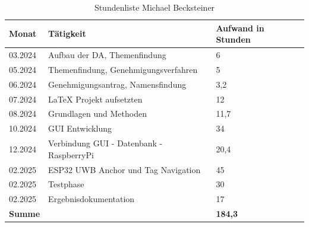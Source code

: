 \begin{table}[h]
	\begin{tabular}{p{2.5cm} p{10.5cm} p{2.5cm}}
		\hline
		\textbf{Monat} & \textbf{Tätigkeit} & \textbf{Aufwand in Stunden} \\
		\hline
		03.2024 & Aufbau der DA, Themenfindung & 6 \\
		05.2024 & Themenfindung, Genehmigungsverfahren & 5 \\
		06.2024 & Genehmigungsantrag, Namensfindung & 3,2 \\
		07.2024 & LaTeX Projekt aufsetzten& 12 \\
		08.2024 & Grundlagen und Methoden & 11,7 \\
		10.2024 & GUI Entwicklung & 34 \\
		12.2024 & Verbindung GUI - Datenbank - RaspberryPi & 20,4 \\
		02.2025 & ESP32 UWB Anchor und Tag Navigation & 45 \\
		02.2025 & Testphase & 30 \\
		02.2025 &Ergebnisdokumentation & 17 \\
		
		\hline
		\textbf{Summe} & & \textbf{184,3} \\
		\hline
	\end{tabular}
	\caption{Stundenliste Michael Becksteiner}
	\label{tab:arbeitsaufwand_Becksteiner}
\end{table}

\newpage

